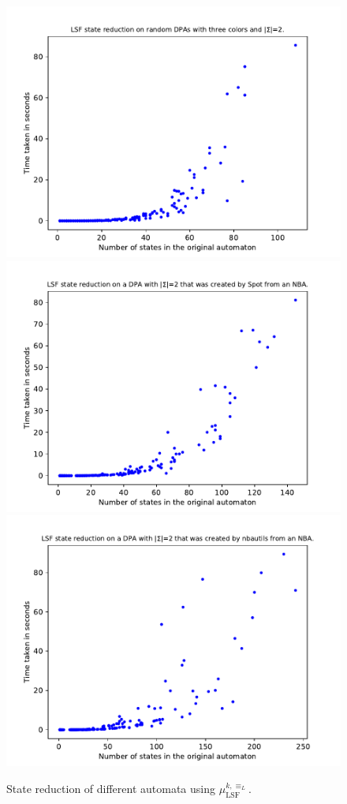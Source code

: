 \begin{figure}
\begin{minipage}{0.49\textwidth}
		\caption{State reduction of different automata using $\mu_\text{LSF}^{k,\equiv_L}$.}
		\label{fig:lsf:empirical_size_hist}
	\end{minipage}
	\hfill
	\begin{minipage}{0.49\textwidth}
		\includegraphics[page=3,height=.3\textheight]{../data/analysis/lsf/gendet_ap1.pdf} 
		\includegraphics[page=3,height=.3\textheight]{../data/analysis/lsf/detspot_ap1.pdf} 
		\includegraphics[page=3,height=.3\textheight]{../data/analysis/lsf/detnbaut_ap1.pdf} 

\end{minipage}
\end{figure}
